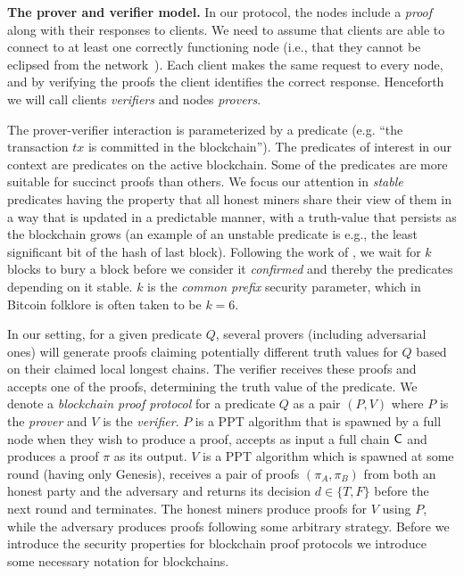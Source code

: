 \noindent
\textbf{The prover and verifier model.}
In our protocol, the nodes include a \emph{proof} along with their responses to
clients. We need to assume that clients are able to connect to at least one
correctly functioning node (i.e., that they cannot be eclipsed from the
network~\cite{eclipse,hijackingbitcoin}). Each client makes the same
request to every node, and by verifying the proofs the client identifies the
correct response. Henceforth we will call clients \emph{verifiers} and nodes
\emph{provers}.

The prover-verifier interaction is parameterized by a predicate (e.g. ``the
transaction $tx$ is committed in the blockchain'').
%
The predicates of interest in our context are predicates on the active
blockchain. Some of the predicates are more suitable for succinct proofs than
others. We focus our attention in \emph{stable} predicates having the property
that all honest miners share their view of them in a way that is updated in a
predictable manner, with a truth-value that persists as the blockchain grows (an
example of an unstable predicate is e.g., the least significant bit of the hash
of last block). Following the work of \cite{backbone}, we wait for $k$ blocks to
bury a block before we consider it \emph{confirmed} and thereby the predicates
depending on it stable. $k$ is the \emph{common prefix} security parameter,
which in Bitcoin folklore is often taken to be $k = 6$.

In our setting, for a given predicate $Q$, several  provers (including
adversarial ones) will generate proofs claiming potentially different truth
values for $Q$ based on their claimed local longest chains. The verifier
receives these proofs and accepts one of the proofs, determining the truth value
of the predicate.  We denote a  \emph{blockchain proof protocol} for a
predicate $Q$ as a pair $(P, V)$ where $P$ is the \emph{prover} and $V$ is the
\emph{verifier}. $P$ is a PPT algorithm that is spawned by a full node when
they wish to produce a proof, accepts as input a full chain $\mathsf{C}$ and
produces a proof $\pi$ as its output. $V$ is a PPT algorithm which is spawned at
some round (having only Genesis), receives a pair of proofs $(\pi_A, \pi_B)$
from both an honest party and the adversary and returns its decision $d \in \{T,
F\}$ before the next round and terminates. The honest miners produce proofs for
$V$ using $P$, while the adversary produces proofs following some arbitrary
strategy. Before we introduce the security properties for blockchain proof
protocols we introduce some necessary notation for blockchains.
